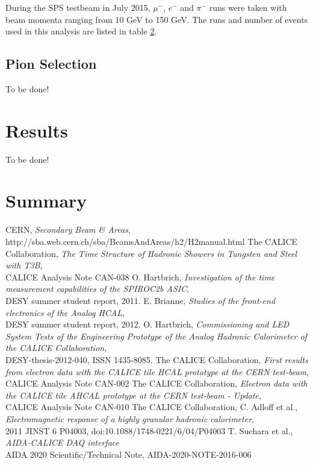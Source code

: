 \documentclass[twoside,a4paper,11pt]{article}
\begin{document}
During the SPS testbeam in July 2015, $\mu^-$, $e^-$ and $\pi^-$ runs were taken with beam momenta ranging from 10 GeV to 150 GeV. 
The runs and number of events used in this analysis are listed in table \ref{}.

\subsection{Pion Selection}

To be done!

\section{Results}

To be done!

\section{Summary}

\clearpage

\begin{thebibliography}{10}

	CERN, \textit{Secondary Beam \& Areas}, \\
	http://sba.web.cern.ch/sba/BeamsAndAreas/h2/H2manual.html
	The CALICE Collaboration, \textit{The Time Structure of Hadronic Showers in Tungsten and Steel with T3B}, \\
	CALICE Analysis Note CAN-038
	 O. Hartbrich, \textit{Investigation of the time measurement capabilities of the SPIROC2b ASIC}, \\
	 DESY summer student report, 2011.
	 E. Brianne, \textit{Studies of the front-end electronics of the Analog HCAL}, \\
	 DESY summer student report, 2012.
	 O. Hartbrich, \textit{Commissioning and LED System Tests of the Engineering Prototype of the Analog Hadronic Calorimeter of the CALICE Collaboration}, \\
	 DESY-thesis-2012-040, ISSN 1435-8085.
	 The CALICE Collaboration, \textit{First results from electron data with the CALICE tile HCAL prototype at the CERN test-beam}, \\
	 CALICE Analysis Note CAN-002
	 The CALICE Collaboration, \textit{Electron data with the CALICE tile AHCAL prototype at the CERN test-beam - Update}, \\
	 CALICE Analysis Note CAN-010
	 The CALICE Collaboration, C. Adloff et al., \textit{Electromagnetic response of a highly granular hadronic calorimeter}, \\
	 2011 JINST 6 P04003, doi:10.1088/1748-0221/6/04/P04003
	 T. Suehara et al., \textit{AIDA-CALICE DAQ interface} \\
	 AIDA 2020 Scientific/Technical Note, AIDA-2020-NOTE-2016-006
\end{thebibliography}
\end{document}
